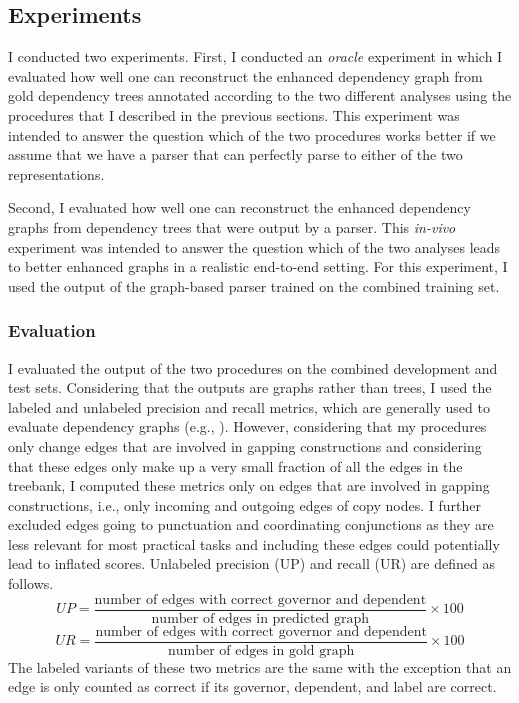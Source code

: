 \documentclass[lucida,biblatex]{sp} %
\begin{document}
\subsection{Experiments}

I conducted two experiments. First, I conducted an {\it oracle} experiment in which I evaluated how well one can reconstruct the enhanced dependency graph from gold dependency trees annotated according to the two different analyses using the procedures that I described in the previous sections. This experiment was intended to answer the question which of the two procedures works better if we assume that we have a parser that can perfectly parse to either of the two representations.

Second, I evaluated how well one can reconstruct the enhanced dependency graphs from dependency trees that were output by a parser. This {\it in-vivo} experiment was intended to answer the question which of the two analyses leads to better enhanced graphs in a realistic end-to-end setting. For this experiment, I used the output of the graph-based parser trained on the {\sc combined} training set.

\subsubsection{Evaluation}

I evaluated the output of the two procedures on the {\sc combined} development and test sets. Considering that the outputs are graphs rather than trees, I used the labeled and unlabeled precision and recall metrics, which are generally used to evaluate dependency graphs (e.g., \cite{Oepen2015}).
However, considering that my procedures only change edges that are involved in gapping constructions and considering that these edges only make up a very small fraction of all the edges in the treebank, I computed these metrics only on edges that are involved in gapping constructions, i.e., only incoming and outgoing edges of copy nodes. I further excluded edges going to punctuation and coordinating conjunctions as they are less relevant for most practical tasks and including these edges could potentially lead to inflated scores. Unlabeled precision (UP) and recall (UR) are defined as follows.
$$UP = \frac{\mbox{number of edges with correct governor and dependent}}{\mbox{number of edges in predicted graph}} \times 100 $$
$$UR = \frac{\mbox{number of edges with correct governor and dependent}}{\mbox{number of edges in gold graph}} \times 100$$
The labeled variants of these two metrics are the same with the exception that an edge is only counted as correct if its governor, dependent, and label are correct.
\end{document}
